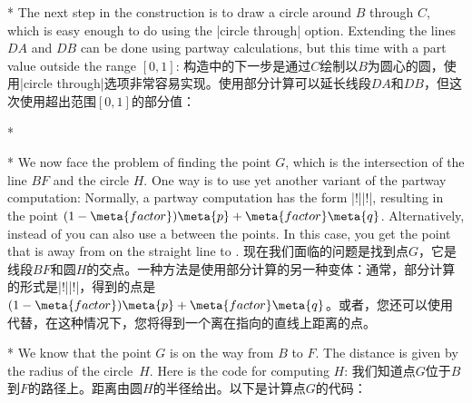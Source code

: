 \begin{paracol}{2}
\switchcolumn[0]*%
The next step in the construction is to draw a circle around $B$ through $C$,
which is easy enough to do using the |circle through| option. Extending the
lines $DA$ and $DB$ can be done using partway calculations, but this time with
a part value outside the range $[0,1]$:
\switchcolumn
构造中的下一步是通过$C$绘制以$B$为圆心的圆，使用|circle through|选项非常容易实现。使用部分计算可以延长线段$DA$和$DB$，但这次使用超出范围$[0,1]$的部分值：

\switchcolumn[1]*%
\begin{codeexample}[preamble={\usetikzlibrary{calc,through}}]
\end{codeexample}

\switchcolumn[0]*%
We now face the problem of finding the point $G$, which is the intersection of
the line $BF$ and the circle $H$. One way is to use yet another variant of the
partway computation: Normally, a partway computation has the form
|!||!|, resulting in the point
$(1-\meta{factor})\meta{p} + \meta{factor}\meta{q}$. Alternatively, instead of
 you can also use a  between the points. In this
case, you get the point that is  away from  on the
straight line to .
\switchcolumn
现在我们面临的问题是找到点$G$，它是线段$BF$和圆$H$的交点。一种方法是使用部分计算的另一种变体：通常，部分计算的形式是|!||!|，得到的点是$(1-\meta{factor})\meta{p} + \meta{factor}\meta{q}$。或者，您还可以使用代替，在这种情况下，您将得到一个离在指向的直线上距离的点。

\switchcolumn[0]*%
We know that the point $G$ is on the way from $B$ to $F$. The distance is given
by the radius of the circle~$H$. Here is the code for computing $H$:
\switchcolumn
我们知道点$G$位于$B$到$F$的路径上。距离由圆$H$的半径给出。以下是计算点$G$的代码：


\end{paracol}
